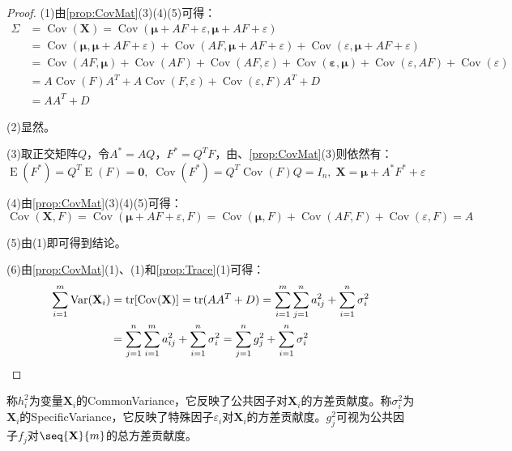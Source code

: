 \begin{proof}
	(1)由\cref{prop:CovMat}(3)(4)(5)可得：
	\begin{align*}
		\Sigma&=\operatorname{Cov}(\mathbf{X})=\operatorname{Cov}(\boldsymbol{\mu}+AF+\varepsilon,\boldsymbol{\mu}+AF+\varepsilon) \\
		&=\operatorname{Cov}(\boldsymbol{\mu},\boldsymbol{\mu}+AF+\varepsilon)+\operatorname{Cov}(AF,\boldsymbol{\mu}+AF+\varepsilon)+\operatorname{Cov}(\varepsilon,\boldsymbol{\mu}+AF+\varepsilon) \\
		&=\operatorname{Cov}(AF,\boldsymbol{\mu})+\operatorname{Cov}(AF)+\operatorname{Cov}(AF,\varepsilon)+\operatorname{Cov}(\mathbf{\varepsilon},\boldsymbol{\mu})+\operatorname{Cov}(\varepsilon,AF)+\operatorname{Cov}(\varepsilon) \\
		&=A\operatorname{Cov}(F)A^T+A\operatorname{Cov}(F,\varepsilon)+\operatorname{Cov}(\varepsilon,F)A^T+D \\
		&=AA^T+D
	\end{align*}\par
	(2)显然。\par
	(3)取正交矩阵$Q$，令$A^*=AQ$，$F^*=Q^TF$，由、\cref{prop:CovMat}(3)则依然有：
	\begin{equation*}
		\operatorname{E}(F^*)=Q^T\operatorname{E}(F)=\mathbf{0},\;\operatorname{Cov}(F^*)=Q^T\operatorname{Cov}(F)Q=I_n,\;\mathbf{X}=\boldsymbol{\mu}+A^*F^*+\varepsilon
	\end{equation*}\par
	(4)由\cref{prop:CovMat}(3)(4)(5)可得：
	\begin{equation*}
		\operatorname{Cov}(\mathbf{X},F)=\operatorname{Cov}(\boldsymbol{\mu}+AF+\varepsilon,F)=\operatorname{Cov}(\boldsymbol{\mu},F)+\operatorname{Cov}(AF,F)+\operatorname{Cov}(\varepsilon,F)=A
	\end{equation*}\par
	(5)由(1)即可得到结论。\par
	(6)由\cref{prop:CovMat}(1)、(1)和\cref{prop:Trace}(1)可得：
	\begin{align*}
		\sum_{i=1}^{m}\operatorname{Var}(\mathbf{X}_i)&=\operatorname{tr}[\operatorname{Cov}(\mathbf{X})]=\operatorname{tr}(AA^T+D)=\sum_{i=1}^{m}\sum_{j=1}^{n}a_{ij}^2+\sum_{i=1}^{n}\sigma_i^2 \\
		&=\sum_{j=1}^{n}\sum_{i=1}^{m}a_{ij}^2+\sum_{i=1}^{n}\sigma_i^2=\sum_{j=1}^{n}g_j^2+\sum_{i=1}^{n}\sigma_i^2\qedhere
	\end{align*}
\end{proof}
\begin{definition}
	称$h_i^2$为变量$\mathbf{X}_i$的\gls{CommonVariance}，它反映了公共因子对$\mathbf{X}_i$的方差贡献度。称$\sigma_i^2$为$\mathbf{X}_i$的\gls{SpecificVariance}，它反映了特殊因子$\varepsilon_i$对$\mathbf{X}_i$的方差贡献度。$g_j^2$可视为公共因子$f_j$对$\seq{\mathbf{X}}{m}$的总方差贡献度。
\end{definition}

